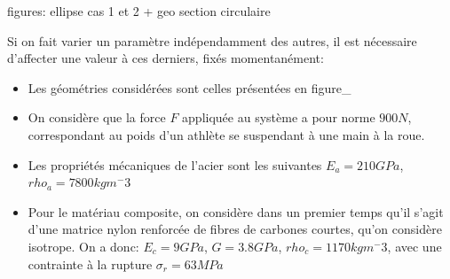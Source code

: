 figures: ellipse cas 1 et 2 + geo section circulaire


Si on fait varier un paramètre indépendamment des autres, il est nécessaire d'affecter une valeur à ces derniers, fixés momentanément:
\begin{itemize}
	\item Les géométries considérées sont celles présentées en figure_
	\item On considère que la force $F$ appliquée au système a pour norme $900 N$, correspondant au poids d'un athlète se suspendant à une main à la roue.
	\item Les propriétés mécaniques de l'acier sont les suivantes $E_a=210GPa$, $rho_a=7800 kg m^-3$
	\item Pour le matériau composite, on considère dans un premier temps qu'il s'agit d'une matrice nylon renforcée de fibres de carbones courtes, qu'on considère isotrope. On a donc: $E_c=9 GPa$, $G=3.8 GPa$, $rho_c=1170 kg m^-3$, avec une contrainte à la rupture $\sigma_r=63 MPa$


\end{itemize}
